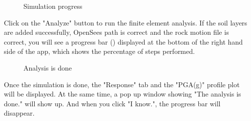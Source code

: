 \begin{figure}[!htbp]
  \caption{Simulation progress }
  \label{fig:progress}
\end{figure}

Click on the "Analyze" button to run the finite element analysis.
If the soil layers are added successfully, OpenSees path is correct and the rock motion file is correct,
you will see a progress bar () displayed at the bottom of the right hand side of the app, which shows the percentage of steps performed. 

\begin{figure}[!htbp]
  \caption{Analysis is done }
  \label{fig:done}
\end{figure}

Once the simulation is done, the "Response" tab and the "PGA(g)" profile plot will be displayed.
At the same time, 
a pop up window showing "The analysis is done." will show up.
And when you click "I know.", the progress bar will disappear.
